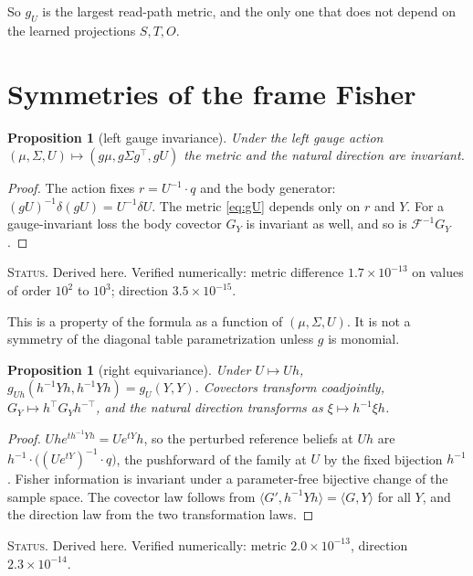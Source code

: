\documentclass[11pt]{article}
\newtheorem{proposition}[theorem]{Proposition}
\theoremstyle{definition}
\theoremstyle{remark}
\newcommand{\ip}[2]{\langle #1, #2\rangle}
\newcommand{\status}[1]{\par\smallskip\noindent\textsc{Status.} #1\par\smallskip}
\begin{document}
So $g_U$ is the largest read-path metric, and the only one that does not depend on the learned projections $S,T,O$.

\section{Symmetries of the frame Fisher}\label{sec:symmetries}

\begin{proposition}[left gauge invariance]\label{prop:left}
Under the left gauge action $(\mu,\Sigma,U)\mapsto(g\mu,g\Sigma g^\top,gU)$ the metric and the natural direction are invariant.
\end{proposition}
\begin{proof}
The action fixes $r=U^{-1}\cdot q$ and the body generator: $(gU)^{-1}\delta(gU)=U^{-1}\delta U$. The metric \eqref{eq:gU} depends only on $r$ and $Y$. For a gauge-invariant loss the body covector $G_Y$ is invariant as well, and so is $\mathcal{F}^{-1}G_Y$.
\end{proof}
\status{Derived here. Verified numerically: metric difference $1.7\times10^{-13}$ on values of order $10^2$ to $10^3$; direction $3.5\times10^{-15}$.}

This is a property of the formula as a function of $(\mu,\Sigma,U)$. It is not a symmetry of the diagonal table parametrization unless $g$ is monomial.

\begin{proposition}[right equivariance]\label{prop:right}
Under $U\mapsto Uh$, $g_{Uh}(h^{-1}Yh,h^{-1}Yh)=g_U(Y,Y)$. Covectors transform coadjointly, $G_Y\mapsto h^\top G_Yh^{-\top}$, and the natural direction transforms as $\xi\mapsto h^{-1}\xi h$.
\end{proposition}
\begin{proof}
$Uhe^{t h^{-1}Yh}=Ue^{tY}h$, so the perturbed reference beliefs at $Uh$ are $h^{-1}\cdot\big((Ue^{tY})^{-1}\cdot q\big)$, the pushforward of the family at $U$ by the fixed bijection $h^{-1}$. Fisher information is invariant under a parameter-free bijective change of the sample space. The covector law follows from $\ip{G'}{h^{-1}Yh}=\ip{G}{Y}$ for all $Y$, and the direction law from the two transformation laws.
\end{proof}
\status{Derived here. Verified numerically: metric $2.0\times10^{-13}$, direction $2.3\times10^{-14}$.}
\end{document}
